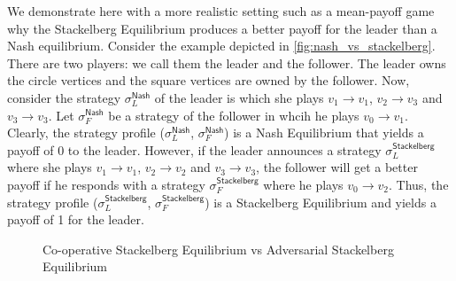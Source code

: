 We demonstrate here with a more realistic setting such as a mean-payoff game why the Stackelberg Equilibrium produces a better payoff for the leader than a Nash equilibrium. Consider the example depicted in \cref{fig:nash_vs_stackelberg}. There are two players: we call them the leader and the follower. The leader owns the circle vertices and the square vertices are owned by the follower. Now, consider the strategy $\sigma_L^{\mathsf{Nash}}$ of the leader is which she plays $v_1 \to v_1$, $v_2 \to v_3$ and $v_3 \to v_3$. Let $\sigma_F^{\mathsf{Nash}}$ be a strategy of the follower in whcih he plays $v_0 \to v_1$. Clearly, the strategy profile ($\sigma_L^{\mathsf{Nash}}$, $\sigma_F^{\mathsf{Nash}}$) is a Nash Equilibrium that yields a payoff of 0 to the leader. However, if the leader announces a strategy $\sigma_L^{\mathsf{Stackelberg}}$ where she plays $v_1 \to v_1$, $v_2 \to v_2$ and $v_3 \to v_3$, the follower will get a better payoff if he responds with a strategy $\sigma_F^{\mathsf{Stackelberg}}$ where he plays $v_0 \to v_2$. Thus, the strategy profile ($\sigma_L^{\mathsf{Stackelberg}}$, $\sigma_F^{\mathsf{Stackelberg}}$) is a Stackelberg Equilibrium and yields a payoff of 1 for the leader.

\begin{figure}
    \centering
    \caption{Co-operative Stackelberg Equilibrium vs Adversarial Stackelberg Equilibrium}
    \label{fig:co-operative_vs_adversarial}
\end{figure}

